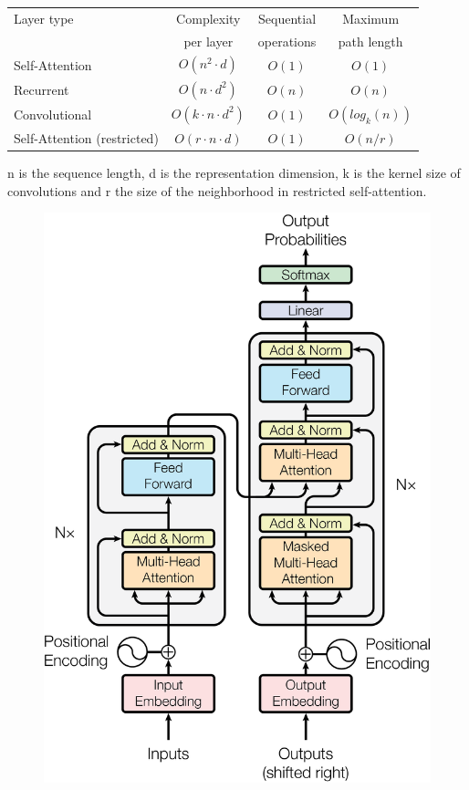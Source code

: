 \begin{table}
\centering
\begin{tabular}{l|ccc}
\toprule
Layer type        &   Complexity             &  Sequential & Maximum        \\
                  &   per layer              &  operations & path length    \\
\midrule
Self-Attention    & $O(n^2 \cdot d)$         & $O(1)$      & $O(1)$         \\
Recurrent         & $O(n \cdot d^2)$         & $O(n)$      & $O(n)$         \\
Convolutional     & $O(k \cdot n \cdot d^2)$ & $O(1)$      & $O(log_k (n))$ \\
Self-Attention (restricted) & $O(r \cdot n \cdot d)$       & $O(1)$ & $O(n/r)$  \\
\bottomrule
\end{tabular}
 {
	n is the sequence length, 
	d is the representation dimension, 
	k is the kernel size of convolutions and 
	r the size of the neighborhood in restricted self-attention.
}
\label{tab:layer_complexity_comp}
\end{table}


\begin{figure}[h]
	\centering
	\includegraphics[width=0.9\columnwidth]{../img/transformer_architecture.png}
	 {}
	\label{fig:transformer_architecture}
\end{figure}

